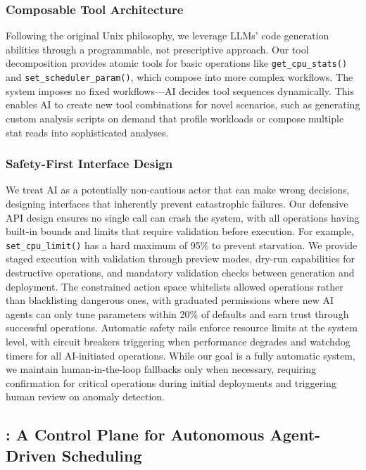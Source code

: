 \subsubsection{Composable Tool Architecture}

Following the original Unix philosophy, we leverage LLMs' code generation abilities through a programmable, not prescriptive approach. Our tool decomposition provides atomic tools for basic operations like \texttt{get\_cpu\_stats()} and \texttt{set\_scheduler\_param()}, which compose into more complex workflows. The system imposes no fixed workflows—AI decides tool sequences dynamically. This enables AI to create new tool combinations for novel scenarios, such as generating custom analysis scripts on demand that profile workloads or compose multiple stat reads into sophisticated analyses.

\subsubsection{Safety-First Interface Design}

We treat AI as a potentially non-cautious actor that can make wrong decisions, designing interfaces that inherently prevent catastrophic failures. Our defensive API design ensures no single call can crash the system, with all operations having built-in bounds and limits that require validation before execution. For example, \texttt{set\_cpu\_limit()} has a hard maximum of 95\% to prevent starvation. We provide staged execution with validation through preview modes, dry-run capabilities for destructive operations, and mandatory validation checks between generation and deployment. The constrained action space whitelists allowed operations rather than blacklisting dangerous ones, with graduated permissions where new AI agents can only tune parameters within 20\% of defaults and earn trust through successful operations. Automatic safety rails enforce resource limits at the system level, with circuit breakers triggering when performance degrades and watchdog timers for all AI-initiated operations. While our goal is a fully automatic system, we maintain human-in-the-loop fallbacks only when necessary, requiring confirmation for critical operations during initial deployments and triggering human review on anomaly detection.

\subsection{\sys: A Control Plane for Autonomous Agent-Driven Scheduling}


